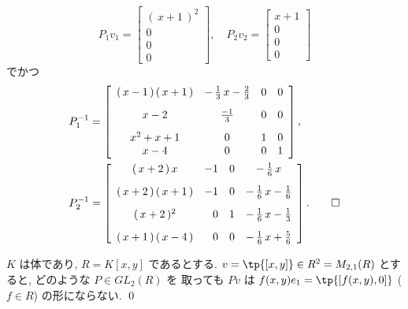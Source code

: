 \documentclass[12pt,twoside]{jarticle}
\begin{document}
{\begin{equation*}
  P_1v_1 =
  \left[ 
    \begin{array}{c}
      (\,{x} + 1\,)^{2} \\
      0 \\
      0 \\
      0
    \end{array}
 \right],
 \quad
 P_2v_2 =
 \left[ 
   \begin{array}{c}
     {x} + 1 \\
     0 \\
     0 \\
     0
   \end{array}
 \right]
\end{equation*}
でかつ
\begin{align*}
  &
  P_1^{-1} =
  \left[ 
    \begin{array}{ccrr}
      (\,{x} - 1\,)\,(\,{x} + 1\,) &  - \,{\frac {1}{3}}
      \,{x} - {\frac {2}{3}} & 0 & 0 \\ [2ex]
      {x} - 2 & {\frac {-1}{3}} & 0 & 0 \\ [2ex]
      {x}^{2} + {x} + 1 & 0 & 1 & 0 \\
      {x} - 4 & 0 & 0 & 1
    \end{array}
  \right],
  \\ &
  P_2^{-1} = 
  \left[ 
    \begin{array}{crrc}
      (\,{x} + 2\,)\,{x} & -1 & 0 &  - \,{\frac {1}{6}}\,
      {x} \\ [2ex]
      (\,{x} + 2\,)\,(\,{x} + 1\,) & -1 & 0 &  - \,{
        \frac {1}{6}}\,{x} - {\frac {1}{6}} \\ [2ex]
      (\,{x} + 2\,)^{2} & 0 & 1 &  - \,{\frac {1}{6}}\,{x
        } - {\frac {1}{3}} \\ [2ex]
      (\,{x} + 1\,)\,(\,{x} - 4\,) & 0 & 0 &  - \,{
        \frac {1}{6}}\,{x} + {\frac {5}{6}}
    \end{array}
  \right].
  \qed
\end{align*}
}


\begin{question}
\label{q:cannot-Euclid-K[x,y]}
  $K$ は体であり, $R=K[x,y]$ であるとする.  $v = \tp{[x,y]}
  \in R^2=M_{2,1}(R)$ とすると, どのような $P\in GL_2(R)$ を
  取っても $Pv$ は $f(x,y)e_1=\tp{[f(x,y),0]}$ ($f\in R$) の形にならない.
  \qed
\end{question}
\end{document}
